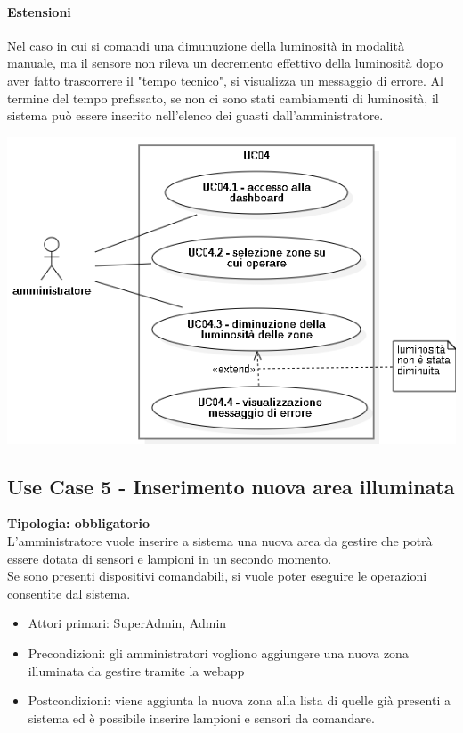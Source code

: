 \documentclass[12pt]{article}
\begin{document}
\paragraph{Estensioni} Nel caso in cui si comandi una dimunuzione della luminosità in modalità manuale, ma il sensore non rileva un decremento effettivo della luminosità dopo aver fatto trascorrere il "tempo tecnico", si visualizza un messaggio di errore.
Al termine del tempo prefissato, se non ci sono stati cambiamenti di luminosità, il sistema può essere inserito nell'elenco dei guasti dall'amministratore.

\includegraphics[scale=0.5]{UC04.png}

\subsection{Use Case 5 - Inserimento nuova area illuminata}
\textbf{Tipologia: obbligatorio} \\
L'amministratore vuole inserire a sistema una nuova area da gestire che potrà essere dotata di sensori e lampioni in un secondo momento.\\
Se sono presenti dispositivi comandabili, si vuole poter eseguire le operazioni consentite dal sistema.
\begin{itemize}
	\item Attori primari: SuperAdmin, Admin
	\item Precondizioni: gli amministratori vogliono aggiungere una nuova zona illuminata da gestire tramite la webapp
	\item Postcondizioni: viene aggiunta la nuova zona alla lista di quelle già presenti a sistema ed è possibile inserire lampioni e sensori da comandare.
\end{itemize}
\end{document}
